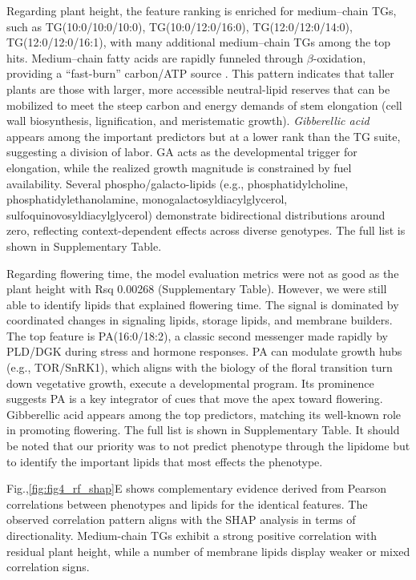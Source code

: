 \documentclass[10pt,letterpaper]{article}
\begin{document}
\begin{itemize}
Regarding plant height, the feature ranking is enriched for medium–chain TGs, such as TG(10{:}0/10{:}0/10{:}0), TG(10{:}0/12{:}0/16{:}0), TG(12{:}0/12{:}0/14{:}0), TG(12{:}0/12{:}0/16{:}1), with many additional medium–chain TGs among the top hits. Medium–chain fatty acids are rapidly funneled through $\beta$-oxidation, providing a ``fast-burn'' carbon/ATP source \citep{Schonfeld2016}. This pattern indicates that taller plants are those with larger, more accessible neutral-lipid reserves that can be mobilized to meet the steep carbon and energy demands of stem elongation (cell wall biosynthesis, lignification, and meristematic growth). \textit{Gibberellic acid} appears among the important predictors but at a lower rank than the TG suite, suggesting a division of labor. GA acts as the developmental trigger for elongation, while the realized growth magnitude is constrained by fuel availability. Several phospho/galacto-lipids (e.g., phosphatidylcholine, phosphatidylethanolamine, monogalactosyldiacylglycerol, sulfoquinovosyldiacylglycerol) demonstrate bidirectional distributions around zero, reflecting context-dependent effects across diverse genotypes. The full list is shown in Supplementary Table.

Regarding flowering time, the model evaluation metrics were not as good as the plant height with Rsq 0.00268 (Supplementary Table). However, we were still able to identify lipids that explained flowering time. The signal is dominated by coordinated changes in signaling lipids, storage lipids, and membrane builders. The top feature is PA(16:0/18:2), a classic second messenger made rapidly by PLD/DGK during stress and hormone responses. PA can modulate growth hubs (e.g., TOR/SnRK1), which aligns with the biology of the floral transition turn down vegetative growth, execute a developmental program. Its prominence suggests PA is a key integrator of cues that move the apex toward flowering. Gibberellic acid appears among the top predictors, matching its well-known role in promoting flowering. The full list is shown in Supplementary Table. It should be noted that our priority was to not predict phenotype through the lipidome but to identify the important lipids that most effects the phenotype. 

Fig.,\ref{fig:fig4_rf_shap}E shows complementary evidence derived from Pearson correlations between phenotypes and lipids for the identical features. The observed correlation pattern aligns with the SHAP analysis in terms of directionality. Medium-chain TGs exhibit a strong positive correlation with residual plant height, while a number of membrane lipids display weaker or mixed correlation signs. 




\end{itemize}
\end{document}
